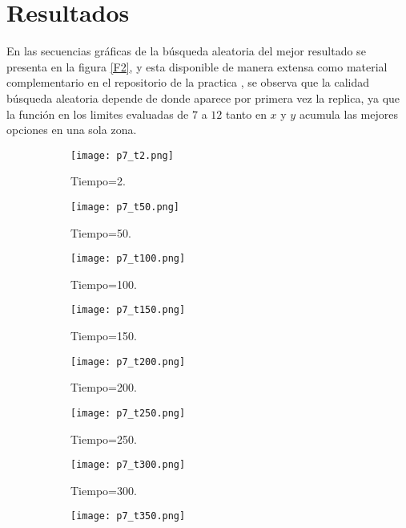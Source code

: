 \documentclass{article}
\begin{document}
\section{Resultados}
En las secuencias gráficas de la búsqueda aleatoria del mejor resultado se presenta en la figura \ref{F2}, y esta disponible de manera extensa como material complementario en el repositorio de la practica \citep{REPOP6}, se observa que la calidad búsqueda aleatoria depende de donde aparece por primera vez la replica, ya que la función en los limites evaluadas de $7$ a $12$ tanto en $x$ y $y$ acumula las mejores opciones en una sola zona.

\begin{figure}
     \begin{subfigure}[]{.25\linewidth}
         \texttt{[image: p7\_t2.png]}
         \caption{Tiempo=2.}
         \label{1}
     \end{subfigure}
     \begin{subfigure}[]{.25\linewidth}
     \centering
         \texttt{[image: p7\_t50.png]}
         \caption{Tiempo=50.}
         \label{2}
     \end{subfigure}
     \begin{subfigure}[]{.25\linewidth}
         \texttt{[image: p7\_t100.png]}
         \caption{Tiempo=100.}
         \label{3}
     \end{subfigure}
     \begin{subfigure}[]{.25\linewidth}
     \centering
         \texttt{[image: p7\_t150.png]}
         \caption{Tiempo=150.}
         \label{4}
    \end{subfigure}
         \begin{subfigure}[]{.25\linewidth}
         \texttt{[image: p7\_t200.png]}
         \caption{Tiempo=200.}
         \label{5}
     \end{subfigure}
     \begin{subfigure}[]{.25\linewidth}
     \centering
         \texttt{[image: p7\_t250.png]}
         \caption{Tiempo=250.}
         \label{6}
    \end{subfigure}
    \begin{subfigure}[]{.25\linewidth}
         \texttt{[image: p7\_t300.png]}
         \caption{Tiempo=300.}
         \label{7}
    \end{subfigure}
     \begin{subfigure}[]{.25\linewidth}
     \centering
         \texttt{[image: p7\_t350.png]}

\end{subfigure}
\end{figure}
\end{document}
